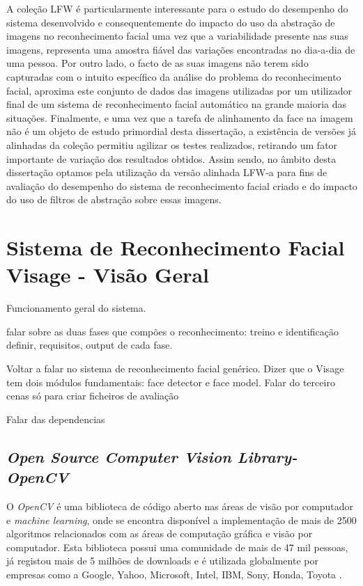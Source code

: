 A coleção LFW é particularmente interessante para o estudo do desempenho do sistema desenvolvido e consequentemente do impacto do uso da abstração de imagens no reconhecimento facial uma vez que a variabilidade presente nas suas imagens, representa uma amostra fiável das variações encontradas no dia-a-dia de uma pessoa. Por outro lado, o facto de as suas imagens não terem sido capturadas com o intuito específico da análise do problema do reconhecimento facial, aproxima este conjunto de dados das imagens utilizadas por um utilizador final de um sistema de reconhecimento facial automático na grande maioria das situações. Finalmente, e uma vez que a tarefa de alinhamento da face na imagem não é um objeto de estudo primordial desta dissertação, a existência de versões já alinhadas da coleção permitiu agilizar os testes realizados, retirando um fator importante de variação dos resultados obtidos. Assim sendo, no âmbito desta dissertação optamos pela utilização da versão alinhada LFW-a \citep{autor} para fins de avaliação do desempenho do sistema de reconhecimento facial criado e do impacto do uso de filtros de abstração sobre essas imagens.

\section{Sistema de Reconhecimento Facial Visage - Visão Geral} \label{sec:visage}
Funcionamento geral do sistema.

falar sobre as duas fases que compões o reconhecimento: treino e identificação
definir, requisitos, output de cada fase.

Voltar a falar no sistema de reconhecimento facial genérico.
Dizer que o Visage tem dois módulos fundamentais: face detector e face model.
Falar do terceiro cenas só para criar ficheiros de avaliação

Falar das dependencias
\subsection{\textit{Open Source Computer Vision Library- OpenCV}}
O \textit{OpenCV} é uma biblioteca de código aberto nas áreas de visão por computador e \textit{machine learning}, onde se encontra disponível a implementação de mais de 2500 algoritmos relacionados com as áreas de computação gráfica e visão por computador. Esta biblioteca possui uma comunidade de mais de 47 mil pessoas, já registou mais de 5 milhões de downloads e é utilizada globalmente por empresas como a Google, Yahoo, Microsoft, Intel, IBM, Sony, Honda, Toyota \cite{Team}. 

